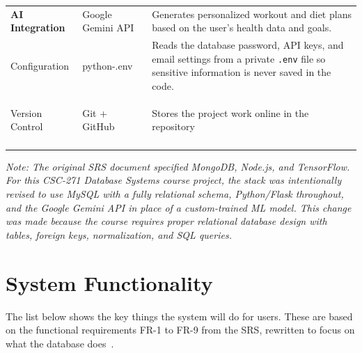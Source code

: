 \documentclass[12pt,a4paper]{article}
\begin{document}
\begin{center}
\begin{tabularx}{\textwidth}{>{\bfseries}p{3.2cm} p{3.8cm} X}
AI Integration & Google Gemini API &
  Generates personalized workout and diet plans based on the user's health data and goals. \\
\addlinespace

Configuration & python-.env &
  Reads the database password, API keys, and email settings from a private \texttt{.env} file so sensitive information is never saved in the code. \\
\addlinespace

Version Control & Git + GitHub &
  Stores the project work online in the repository \cite{github} \\
\addlinespace

\bottomrule
\end{tabularx}
\end{center}
\vspace{0.3cm}
\textit{Note: The original SRS document specified MongoDB, Node.js, and TensorFlow. For this CSC-271 Database Systems course project, the stack was intentionally revised to use MySQL with a fully relational schema, Python/Flask throughout, and the Google Gemini API in place of a custom-trained ML model. This change was made because the course requires proper relational database design with tables, foreign keys, normalization, and SQL queries.}

\section{System Functionality}

The list below shows the key things the system will do for users. These are based on the
functional requirements FR-1 to FR-9 from the SRS, rewritten to focus on what the
database does~\cite{srs}.
\end{document}

